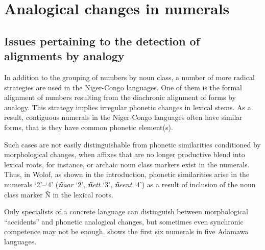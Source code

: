 \chapter{Analogical changes in numerals} \label{sec:2}
\section{Issues pertaining to the detection of alignments by analogy}

In addition to the grouping of numbers by noun class, a number of more radical strategies are used in the Niger-Congo languages. One of them is the formal alignment of numbers resulting from the diachronic alignment of forms by analogy. This strategy implies irregular phonetic changes in lexical stems. As a result, contiguous numerals in the Niger-Congo languages often have similar forms, that is they have common phonetic element(s). 

Such cases are not easily distinguishable from phonetic similarities conditioned by morphological changes, when affixes that are no longer productive blend into lexical roots, for instance, or archaic noun class markers exist in the numerals. Thus, in Wolof, as shown in the introduction, phonetic similarities arise in the numerals `2'–`4' (\textbf{\textit{ñ}}\textit{aar} ‘2’, \textbf{\textit{ñ}}\textit{ett} ‘3’, \textbf{\textit{ñ}}\textit{eent} ‘4’) as a result of inclusion of the noun class marker Ñ in the lexical roots. 

Only specialists of a concrete language can distinguish between morphological “accidents” and phonetic analogical changes, but sometimes even synchronic competence may not be enough.  shows the first six numerals in five Adamawa languages.


\begin{table}
\caption{\label{tab:2:1}Adamawa examples}
\end{table}


